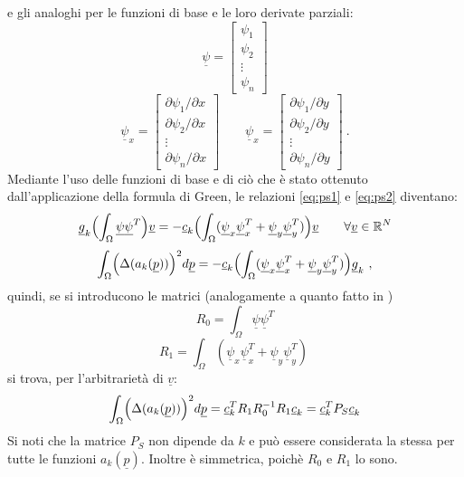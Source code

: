 \documentclass[a4paper,11pt,twoside,openright]{book}							%
\begin{document}
e gli analoghi per le funzioni di base e le loro derivate parziali:
$$
\underline \psi =
\begin{bmatrix}
\psi_{1}  \\
\psi_{2}  \\
\vdots\\
\psi_{n}
\end{bmatrix}
$$
\begin{equation}
\underline \psi_x=  \begin{bmatrix}
\partial \psi_{1}/\partial x \\
\partial \psi_{2}/\partial x  \\
\vdots\\
\partial \psi_{n}/\partial x \end{bmatrix} 
\qquad
\underline \psi_x=  \begin{bmatrix}
\partial \psi_{1}/\partial y  \\
\partial \psi_{2}/\partial y  \\
\vdots\\
\partial \psi_{n}/\partial y\end{bmatrix} \ .
\end{equation}
Mediante l'uso delle funzioni di base e di ciò che è stato ottenuto dall'applicazione della formula di Green, le relazioni \ref{eq:ps1} e \ref{eq:ps2} diventano:
$$
\underline{g}_k \Bigl(\int_\Omega \underline \psi \underline \psi^T \Bigr)\underline{v}=
-\underline{c}_k \Bigl(\int_\Omega (\underline \psi_x \underline \psi_x^T + \underline \psi_y \underline \psi_y^T)\Bigr) \underline{v} \qquad \forall \underline{v} \in \mathbb{R}^N
$$
$$
\int_{\Omega} \Bigl( \Delta(  a_k(\underline p)  ) \Bigr)^2 d \underline p = -\underline{c}_k \Bigl(\int_\Omega (\underline \psi_x \underline \psi_x^T + \underline \psi_y \underline \psi_y^T) \Bigr)\underline{g}_k \ ,
$$
quindi, se si introducono le matrici (analogamente a quanto fatto in \cite{art:sangalli})
$$ R_0 = \int_\Omega \underline \psi \underline \psi^T $$
$$ R_1 = \int_\Omega (\underline \psi_x \underline \psi_x^T + \underline \psi_y \underline \psi_y^T) \ $$
si trova, per l'arbitrarietà di $\underline v$:
\begin{equation}
\label{eq:pspace}
\int_{\Omega} \Bigl( \Delta(  a_k(\underline p)  ) \Bigr)^2 d \underline p = \underline{c}_k^T R_1 R_0^{-1} R_1 \underline{c}_k=\underline{c}_k^T P_S \underline{c}_k
\end{equation}
Si noti che la matrice $P_S$ non dipende da $k$ e può essere considerata la stessa per tutte le funzioni $a_k(\underline{p})$. Inoltre è simmetrica, poichè $R_0$ e $R_1$ lo sono.
\end{document}

